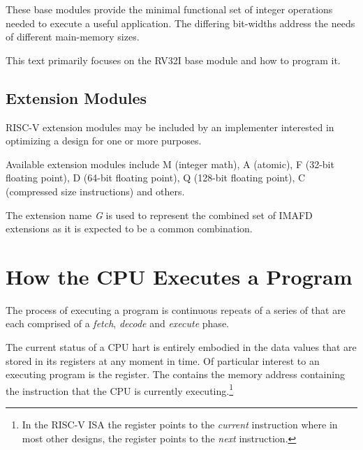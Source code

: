 These base modules provide the minimal functional set of integer operations
needed to execute a useful application.  The differing bit-widths address
the needs of different main-memory sizes.

This text primarily focuses on the RV32I base module and how to program it.


\subsection{Extension Modules}

RISC-V extension modules may be included by an implementer interested
in optimizing a design for one or more purposes.\cite[p.~4]{rvismv1v22:2017}

%
%
%
%
%
%
Available extension modules include M (integer math), A (atomic),
F (32-bit floating point), D (64-bit floating point), 
Q (128-bit floating point), C (compressed size instructions) and others.

%
The extension name {\em G} is used to represent the combined set of IMAFD
extensions as it is expected to be a common combination.




\section{How the CPU Executes a Program}

The process of executing a program is continuous repeats of a series of
 that are each comprised
of a {\em fetch}, {\em decode} and {\em execute} phase.
 
The current status of a CPU hart is entirely embodied in the data values that
are stored in its registers at any moment in time.  Of particular interest
to an executing program is the  register.  The  contains
the memory address containing the instruction that the CPU is currently 
executing.\footnote{In the RISC-V ISA the  register points to the 
{\em current} instruction where in most other designs, the 
register points to the {\em next} instruction.}

